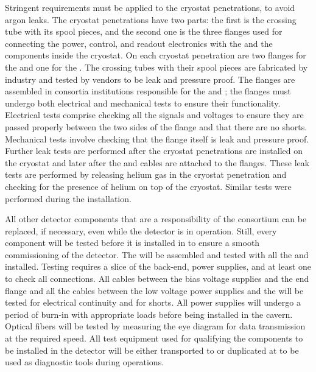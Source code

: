 Stringent requirements must be applied to the cryostat
penetrations, to avoid argon leaks. The cryostat penetrations have two parts: the first is the crossing tube with its spool pieces,
and the second one is the three flanges used for
connecting the power, control, and readout electronics with the
 and the  components inside the
cryostat. On each cryostat penetration are two flanges for
the  and one for the . The crossing
tubes with their spool pieces are fabricated by industry and tested
by vendors to be leak and pressure proof. The flanges are assembled
in consortia institutions responsible for the  and ; the
flanges must undergo both electrical and mechanical tests to ensure their
functionality. Electrical tests comprise checking all the
signals and voltages to ensure they are passed properly between the two sides of the
flange and that there are no shorts. Mechanical tests involve 
checking that the flange itself is leak and pressure proof. Further
leak tests are performed after the cryostat penetrations are installed
on the cryostat and later after the  and 
cables are attached to the flanges. These leak tests are
performed by releasing helium gas in the cryostat penetration and
checking for the presence of helium on top of the cryostat. Similar
tests were performed during the  installation.

All other detector components that are a responsibility of
the  consortium can be replaced, if necessary,
even while the detector is in operation. Still, every component
will be tested before it is installed in  to ensure a
smooth commissioning of the detector. The  will be
assembled and tested with all the  and 
installed. Testing requires a slice of the  back-end,
power supplies, and at least one  to check all 
connections. All cables between the bias voltage supplies and
the end flange and all the cables between the low voltage power
supplies and the  will be tested for electrical
continuity and for shorts. All power supplies will undergo a
period of burn-in with appropriate loads before being installed
in the cavern. Optical fibers will be tested by measuring the
eye diagram for data transmission at the required speed. All
test equipment used for qualifying the components to be installed
in the detector will be either transported to  or duplicated
at  to be used as diagnostic tools during operations.

